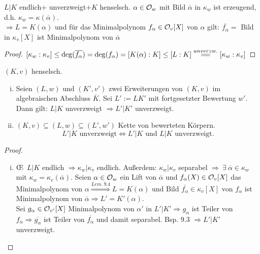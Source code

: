 \begin{Bem}
$L|K$ endlich+ unverzweigt+$K$ henselsch. $\alpha \in \mathcal{O}_w$ mit Bild $\overline{\alpha}$ in $\kappa_w$ ist erzeugend, d.h. $\kappa_w=\kappa(\overline{\alpha})$.\\
$\Rightarrow L=K(\alpha)$ und für das Minimalpolynom $f_\alpha \in \mathcal{O}_v[X]$ von $\alpha$ gilt: $\overline{f_\alpha}=$ Bild in $\kappa_v[X]$ ist Minimalpolynom von $\overline{\alpha}$
\end{Bem}

\begin{proof}
$[\kappa_w:\kappa_v] \leq \deg(\overline{f_\alpha})=\deg(f_\alpha)=[K(\alpha):K] \leq [L:K]\stackrel{unverzw.}{=\joinrel=}[\kappa_w : \kappa_v]$
\end{proof}

\begin{Prop}
$(K,v)$ henselsch.
\begin{enumerate}[i)]
\item Seien $(L,w)$ und $(K',v')$ zwei Erweiterungen von $(K,v)$ im algebraischen Abschluss $\overline{K}$. Sei $L':=LK'$ mit fortgesetzter Bewertung $w'$. Dann gilt: $L|K$ unverzweigt $\Rightarrow L'|K'$ unverzweigt.
\item $(K,v) \subseteq (L,w) \subseteq (L',w')$ Kette von bewerteten Körpern.
\[L'|K \text{ unverzweigt} \iff L'|K \text{ und } L|K \text{ unverzweigt}.\]
\end{enumerate}
\end{Prop}

\begin{proof}
\begin{enumerate}[i)]
\item \OE \ $L|K$ endlich $\Rightarrow \kappa_w| \kappa_v$ endlich. Außerdem: $\kappa_w|\kappa_v$ separabel $\Rightarrow \ \exists \ \overline{\alpha} \in \kappa_w$ mit $\kappa_w=\kappa_v(\overline{\alpha})$. Seien $\alpha \in \mathcal{O}_w$ ein Lift von $\overline{\alpha}$ und $f_\alpha(X) \in \mathcal{O}_v[X]$ das Minimalpolynom von $\alpha \stackrel{Lem.\ 9.4}{\Longrightarrow} L=K(\alpha)$ und Bild $\overline{f_\alpha} \in \kappa_v[X]$ von $f_\alpha$ ist Minimalpolynom von $\overline{\alpha} \Rightarrow L'=K'(\alpha)$.\\
Sei $g_\alpha \in \mathcal{O}_{v'}[X]$ Minimalpolynom von $\alpha'$ in $L'|K' \Rightarrow g_\alpha$ ist Teiler von $f_\alpha \Rightarrow \overline{g_\alpha}$ ist Teiler von $\overline{f_\alpha}$ und damit separabel. Bsp. 9.3 $\Rightarrow L'|K'$ unverzweigt.
\end{enumerate}
\end{proof}

